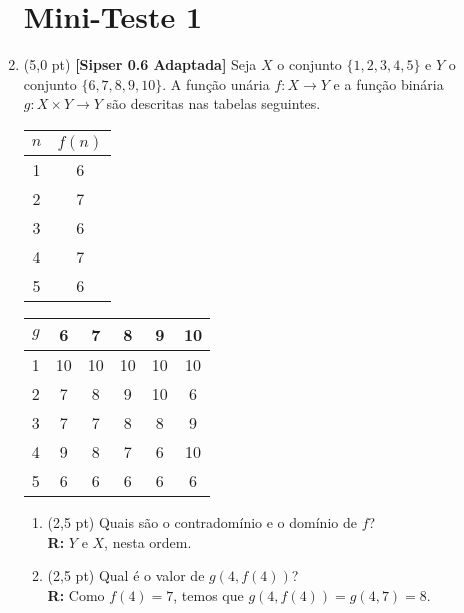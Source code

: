 \documentclass[12pt,a4paper,oneside]{article}
\begin{document}
\begin{enumerate}
	
	\section*{Mini-Teste 1}
	
	\item (5,0 pt) {\bf [Sipser 0.6 Adaptada] } Seja $X$ o conjunto $\{1,2,3,4,5\}$ e $Y$ o conjunto $\{6,7,8,9,10\}$. A função unária
	$f : X \rightarrow Y$ e a função binária $g: X \times Y \rightarrow Y$ são descritas nas tabelas seguintes.
	
	\begin{multicols}{2}
		
		\begin{tabular}{c|c}
			$n$	&	$f(n)$	\\
			\hline
			1 	&	6	\\			
			2 	&	7	\\
			3 	&	6	\\
			4 	&	7	\\
			5 	&	6	\\
			\hline
		\end{tabular}
		
		\columnbreak
		
		\begin{tabular}{c|ccccc}
			$g$	& 	6	& 	7	& 	8	& 	9	&	10 \\
			\hline
			1	&	10	&	10	&	10	&	10	&	10 \\
			2	& 	7	& 	8	& 	9	& 	10	& 	6 \\	
			3	& 	7	& 	7	& 	8	& 	8	& 	9 \\
			4	& 	9	& 	8	& 	7	& 	6	& 	10 \\
			5	& 	6	& 	6	& 	6	& 	6	& 	6 \\
			\hline
		\end{tabular}
		
	\end{multicols}
	
	\begin{enumerate}
		
		\item (2,5 pt) Quais são o contradomínio e o domínio de $f$?\\
		{\color{blue} {\bf R:} $Y$ e $X$, nesta ordem.}
		
		\item (2,5 pt) Qual é o valor de $g(4,f(4))$?\\
		{\color{blue} {\bf R:} Como $f(4) =7$, temos que $g(4,f(4)) = g(4,7) = 8$.}
		

\end{enumerate}
\end{enumerate}
\end{document}
